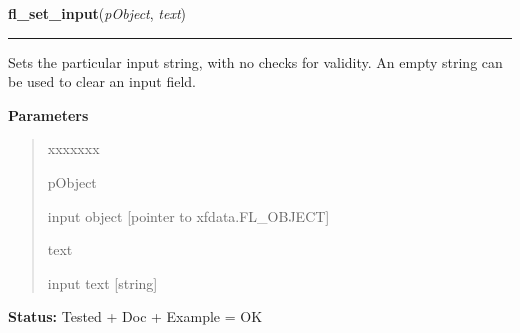     \label{xformslib:library:fl_set_input}

    \vspace{0.5ex}

\hspace{.8\funcindent}\begin{boxedminipage}{\funcwidth}

    \raggedright \textbf{fl\_set\_input}(\textit{pObject}, \textit{text})

    \vspace{-1.5ex}

    \rule{\textwidth}{0.5\fboxrule}
\setlength{\parskip}{2ex}
    Sets the particular input string, with no checks for validity. An empty
    string can be used to clear an input field.

\setlength{\parskip}{1ex}
      \textbf{Parameters}
      \vspace{-1ex}

      \begin{quote}
        \begin{Ventry}{xxxxxxx}

          \item[pObject]

          input object [pointer to xfdata.FL\_OBJECT]

          \item[text]

          input text [string]

        \end{Ventry}

      \end{quote}

\textbf{Status:} Tested + Doc + Example = OK



    \end{boxedminipage}

    \label{xformslib:library:fl_set_input_color}

    \vspace{0.5ex}


